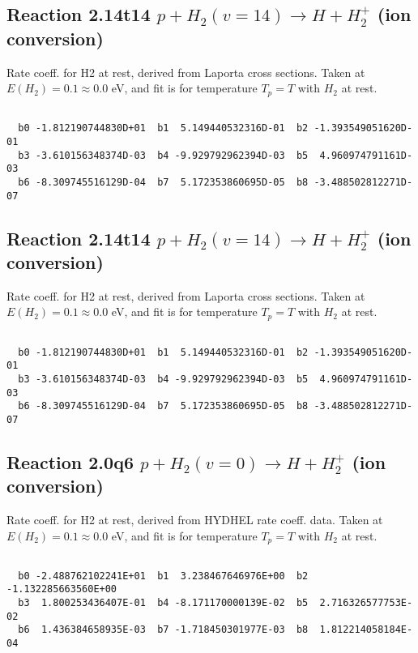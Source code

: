 \newpage
\subsection{
Reaction 2.14t14
$ p + H_2(v=14) \rightarrow H + H_2^+$ (ion conversion)
}
Rate coeff. for H2 at rest, derived from Laporta cross sections.
Taken at $E(H_2) = 0.1 \approx 0.0$ eV,  and fit is for temperature $T_p=T$ with $H_2$ at rest.

\begin{small}\begin{verbatim}

  b0 -1.812190744830D+01  b1  5.149440532316D-01  b2 -1.393549051620D-01
  b3 -3.610156348374D-03  b4 -9.929792962394D-03  b5  4.960974791161D-03
  b6 -8.309745516129D-04  b7  5.172353860695D-05  b8 -3.488502812271D-07

\end{verbatim}\end{small}

\newpage
\subsection{
Reaction 2.14t14
$ p + H_2(v=14) \rightarrow H + H_2^+$ (ion conversion)
}
Rate coeff. for H2 at rest, derived from Laporta cross sections.
Taken at $E(H_2) = 0.1 \approx 0.0$ eV,  and fit is for temperature $T_p=T$ with $H_2$ at rest.

\begin{small}\begin{verbatim}

  b0 -1.812190744830D+01  b1  5.149440532316D-01  b2 -1.393549051620D-01
  b3 -3.610156348374D-03  b4 -9.929792962394D-03  b5  4.960974791161D-03
  b6 -8.309745516129D-04  b7  5.172353860695D-05  b8 -3.488502812271D-07

\end{verbatim}\end{small}

\newpage
\subsection{
Reaction 2.0q6
$ p + H_2(v=0) \rightarrow H + H_2^+$ (ion conversion)
}
Rate coeff. for H2 at rest, derived from HYDHEL rate coeff. data.
Taken at $E(H_2) = 0.1 \approx 0.0$ eV,  and fit is for temperature $T_p=T$ with $H_2$ at rest.

\begin{small}\begin{verbatim}

  b0 -2.488762102241E+01  b1  3.238467646976E+00  b2 -1.132285663560E+00
  b3  1.800253436407E-01  b4 -8.171170000139E-02  b5  2.716326577753E-02
  b6  1.436384658935E-03  b7 -1.718450301977E-03  b8  1.812214058184E-04

\end{verbatim}\end{small}

